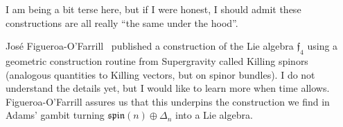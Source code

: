 I am being a bit terse here, but if I were honest, I should admit these
constructions are all really ``the same under the hood''.

Jos\'e Figueroa-O'Farrill~\cite{Figueroa-OFarrill:2007jcv} published a
construction of the Lie algebra $\mathfrak{f}_{4}$ using a geometric
construction routine from Supergravity called Killing spinors (analogous
quantities to Killing vectors, but on spinor bundles). I do not understand
the details yet, but I would like to learn more when time allows.
Figueroa-O'Farrill assures us that this underpins the construction we
find in Adams' gambit turning $\mathfrak{spin}(n)\oplus\Delta_{n}$ 
into a Lie algebra.